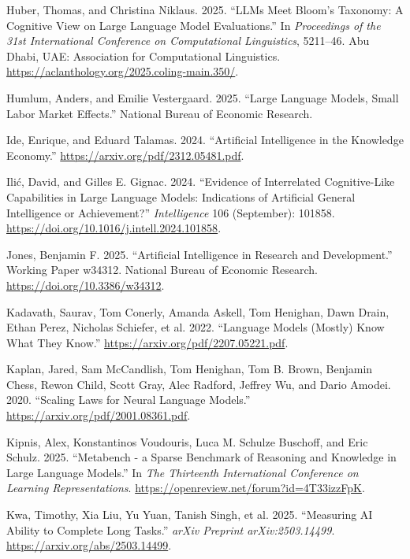 \documentclass[
  letterpaper,
  DIV=11,
  numbers=noendperiod,
  oneside]{scrartcl}
\newlength{\cslhangindent}
\newenvironment{CSLReferences}[2] %
 {\begin{list}{}{%
  \setlength{\itemindent}{0pt}
  \setlength{\leftmargin}{0pt}
  \setlength{\parsep}{0pt}
  \ifodd #1
   \setlength{\leftmargin}{\cslhangindent}
   \setlength{\itemindent}{-1\cslhangindent}
  \fi
  \setlength{\itemsep}{#2\baselineskip}}}
 {\end{list}}
\begin{document}
\begin{CSLReferences}{1}{0}
Huber, Thomas, and Christina Niklaus. 2025. {``LLMs Meet Bloom's
Taxonomy: A Cognitive View on Large Language Model Evaluations.''} In
\emph{Proceedings of the 31st International Conference on Computational
Linguistics}, 5211--46. Abu Dhabi, UAE: Association for Computational
Linguistics. \url{https://aclanthology.org/2025.coling-main.350/}.

Humlum, Anders, and Emilie Vestergaard. 2025. {``Large Language Models,
Small Labor Market Effects.''} National Bureau of Economic Research.

Ide, Enrique, and Eduard Talamas. 2024. {``Artificial Intelligence in
the Knowledge Economy.''} \url{https://arxiv.org/pdf/2312.05481.pdf}.

Ilić, David, and Gilles E. Gignac. 2024. {``Evidence of Interrelated
Cognitive-Like Capabilities in Large Language Models: Indications of
Artificial General Intelligence or Achievement?''} \emph{Intelligence}
106 (September): 101858.
\url{https://doi.org/10.1016/j.intell.2024.101858}.

Jones, Benjamin F. 2025. {``Artificial Intelligence in Research and
Development.''} Working Paper w34312. National Bureau of Economic
Research. \url{https://doi.org/10.3386/w34312}.

Kadavath, Saurav, Tom Conerly, Amanda Askell, Tom Henighan, Dawn Drain,
Ethan Perez, Nicholas Schiefer, et al. 2022. {``Language Models (Mostly)
Know What They Know.''} \url{https://arxiv.org/pdf/2207.05221.pdf}.

Kaplan, Jared, Sam McCandlish, Tom Henighan, Tom B. Brown, Benjamin
Chess, Rewon Child, Scott Gray, Alec Radford, Jeffrey Wu, and Dario
Amodei. 2020. {``Scaling Laws for Neural Language Models.''}
\url{https://arxiv.org/pdf/2001.08361.pdf}.

Kipnis, Alex, Konstantinos Voudouris, Luca M. Schulze Buschoff, and Eric
Schulz. 2025. {``Metabench - a Sparse Benchmark of Reasoning and
Knowledge in Large Language Models.''} In \emph{The Thirteenth
International Conference on Learning Representations}.
\url{https://openreview.net/forum?id=4T33izzFpK}.

Kwa, Timothy, Xia Liu, Yu Yuan, Tanish Singh, et al. 2025. {``Measuring
AI Ability to Complete Long Tasks.''} \emph{arXiv Preprint
arXiv:2503.14499}. \url{https://arxiv.org/abs/2503.14499}.


\end{CSLReferences}
\end{document}
